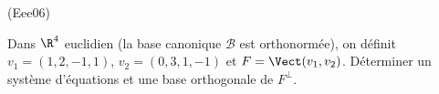 \begin{tiny}(Eee06)\end{tiny}
Dans $\R^{4}$ euclidien (la base canonique $\mathcal{B}$ est
orthonorm{\'e}e), on d{\'e}finit $v_{1}=(1,2,-1,1)$, $v_{2}=(0,3,1,-1)$ et $F = \Vect(v_{1},v_{2})$. D{\'e}terminer un syst{\`e}me d'{\'e}quations et une base orthogonale de $F^{\perp }$.

